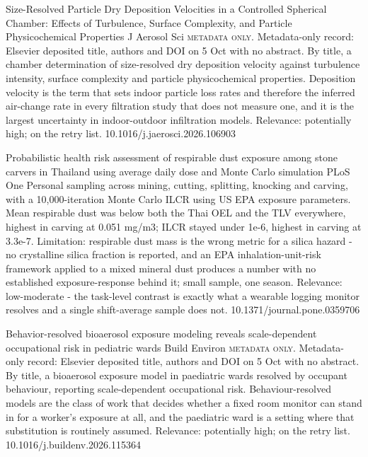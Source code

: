 \documentclass[10pt]{article}
\begin{document}
{Size-Resolved Particle Dry Deposition Velocities in a Controlled Spherical Chamber: Effects of Turbulence, Surface Complexity, and Particle Physicochemical Properties}
{J Aerosol Sci}
{\textsc{metadata only.} Metadata-only record: Elsevier deposited title, authors and DOI on 5 Oct with no abstract. By title, a chamber determination of size-resolved dry deposition velocity against turbulence intensity, surface complexity and particle physicochemical properties. Deposition velocity is the term that sets indoor particle loss rates and therefore the inferred air-change rate in every filtration study that does not measure one, and it is the largest uncertainty in indoor-outdoor infiltration models. Relevance: potentially high; on the retry list.}
{10.1016/j.jaerosci.2026.106903}

\par{}\baselineskip{}\baselineskip
{}

{Probabilistic health risk assessment of respirable dust exposure among stone carvers in Thailand using average daily dose and Monte Carlo simulation}
{PLoS One}
{Personal sampling across mining, cutting, splitting, knocking and carving, with a 10,000-iteration Monte Carlo ILCR using US EPA exposure parameters. Mean respirable dust was below both the Thai OEL and the TLV everywhere, highest in carving at 0.051 mg/m3; ILCR stayed under 1e-6, highest in carving at 3.3e-7. Limitation: respirable dust mass is the wrong metric for a silica hazard - no crystalline silica fraction is reported, and an EPA inhalation-unit-risk framework applied to a mixed mineral dust produces a number with no established exposure-response behind it; small sample, one season. Relevance: low-moderate - the task-level contrast is exactly what a wearable logging monitor resolves and a single shift-average sample does not.}
{10.1371/journal.pone.0359706}

{Behavior-resolved bioaerosol exposure modeling reveals scale-dependent occupational risk in pediatric wards}
{Build Environ}
{\textsc{metadata only.} Metadata-only record: Elsevier deposited title, authors and DOI on 5 Oct with no abstract. By title, a bioaerosol exposure model in paediatric wards resolved by occupant behaviour, reporting scale-dependent occupational risk. Behaviour-resolved models are the class of work that decides whether a fixed room monitor can stand in for a worker's exposure at all, and the paediatric ward is a setting where that substitution is routinely assumed. Relevance: potentially high; on the retry list.}
{10.1016/j.buildenv.2026.115364}
\end{document}
